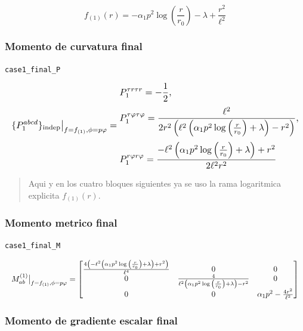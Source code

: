 \documentclass[11pt,a4paper]{article}
\begin{document}
\[
f_{(1)}(r) = - \alpha_{1} p^{2} \log{\left(\frac{r}{r_{0}} \right)} - \lambda + \frac{r^{2}}{\ell^{2}}
\]

\subsubsection{Momento de curvatura final}

\noindent\texttt{case1\_final\_P}\par\nopagebreak[4]

\[
\resizebox{\textwidth}{!}{$\displaystyle \{P_1^{abcd}\}_{\mathrm{indep}}\big|_{f=f_{(1)},\phi=p\varphi} = \begin{aligned}&P_1^{{\tau}{r}{\tau}{r}}=- \frac{1}{2},\\[2pt]&P_1^{{\tau}{\varphi}{\tau}{\varphi}}=\frac{\ell^{2}}{2 r^{2} \left(\ell^{2} \left(\alpha_{1} p^{2} \log{\left(\frac{r}{r_{0}} \right)} + \lambda\right) - r^{2}\right)},\\[2pt]&P_1^{{r}{\varphi}{r}{\varphi}}=\frac{- \ell^{2} \left(\alpha_{1} p^{2} \log{\left(\frac{r}{r_{0}} \right)} + \lambda\right) + r^{2}}{2 \ell^{2} r^{2}}\end{aligned}$}
\]

\begin{quote}\small Aqui y en los cuatro bloques siguientes ya se uso la rama logaritmica explicita \(f_{(1)}(r)\).\end{quote}

\subsubsection{Momento metrico final}

\noindent\texttt{case1\_final\_M}\par\nopagebreak[4]

\[
\resizebox{\textwidth}{!}{$\displaystyle M^{(1)}_{ab}\big|_{f=f_{(1)},\phi=p\varphi} = \left[\begin{matrix}\frac{4 \left(- \ell^{2} \left(\alpha_{1} p^{2} \log{\left(\frac{r}{r_{0}} \right)} + \lambda\right) + r^{2}\right)}{\ell^{4}} & 0 & 0\\0 & \frac{4}{\ell^{2} \left(\alpha_{1} p^{2} \log{\left(\frac{r}{r_{0}} \right)} + \lambda\right) - r^{2}} & 0\\0 & 0 & \alpha_{1} p^{2} - \frac{4 r^{2}}{\ell^{2}}\end{matrix}\right]$}
\]

\subsubsection{Momento de gradiente escalar final}
\end{document}
